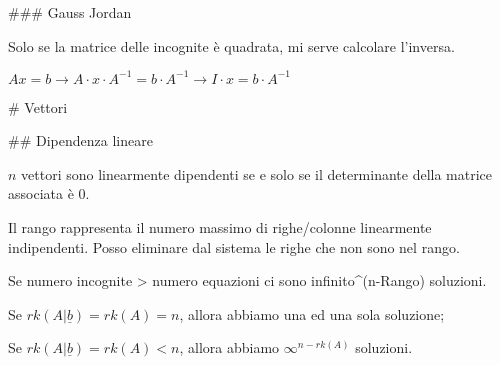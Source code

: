 ### Gauss Jordan

Solo se la matrice delle incognite è quadrata, mi serve calcolare l'inversa.

$Ax=b \rightarrow A\cdot x \cdot A^{-1} = b \cdot A^{-1} \rightarrow I\cdot x = b \cdot A^{-1}$

# Vettori

## Dipendenza lineare

$n$ vettori sono linearmente dipendenti se e solo se il determinante della matrice associata è 0.

Il rango rappresenta il numero massimo di righe/colonne linearmente indipendenti. Posso eliminare dal sistema le righe che non sono nel rango.

Se numero incognite > numero equazioni ci sono infinito^(n-Rango) soluzioni.

Se $rk(A|\underline{b})=rk(A)=n$, allora abbiamo una ed una sola soluzione;

Se $rk(A|\underline{b})=rk(A)<n$, allora abbiamo $\infty^{n-rk(A)}$ soluzioni.

